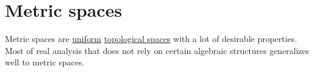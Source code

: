 \chapter{Metric spaces}\label{ch:metric_spaces}

Metric spaces are \hyperref[def:uniform_space]{uniform} \hyperref[def:topological_space]{topological spaces} with a lot of desirable properties. Most of real analysis that does not rely on certain algebraic structures generalizes well to metric spaces.
